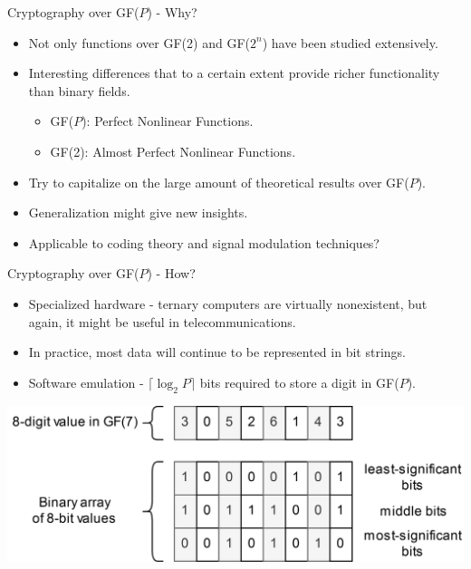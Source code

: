\documentclass{beamer}
\begin{document}
\begin{frame}{Cryptography over GF($P$) - Why?}
\begin{itemize}
    \item Not only functions over GF(2) and GF($2^n$) have been studied extensively.
    \item Interesting differences that to a certain extent provide richer functionality than binary fields.
    \begin{itemize}
        \item GF($P$): Perfect Nonlinear Functions.
        \item GF(2): Almost Perfect Nonlinear Functions.
    \end{itemize}
    \item Try to capitalize on the large amount of theoretical results over GF($P$).
    \item Generalization might give new insights.
    \item Applicable to coding theory and signal modulation techniques?
\end{itemize}
\end{frame}

\begin{frame}{Cryptography over GF($P$) - How?}
\begin{itemize}
    \item Specialized hardware - ternary computers are virtually nonexistent, but again, it might be useful in telecommunications.
    \item In practice, most data will continue to be represented in bit strings.
    \item Software emulation - $\lceil \log_{2}{P} \rceil$ bits required to store a digit in GF($P$).
\end{itemize}
\centering\includegraphics[scale=0.12]{encoding.png}
\end{frame}
\end{document}
